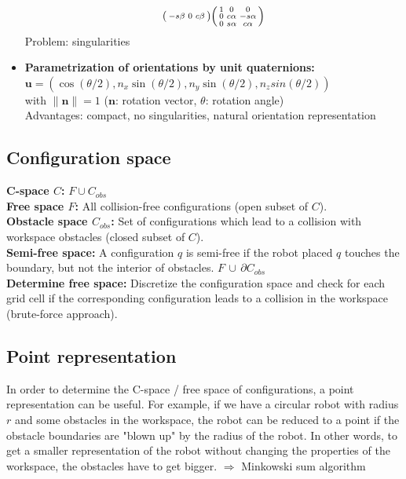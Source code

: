 \begin{multicols*}{2}
\begin{itemize}
\begin{align*}
\begin{psmallmatrix}
			-s\beta & 0 & c\beta
		\end{psmallmatrix}
		\begin{psmallmatrix}
			1 & 0 & 0\\
			0 & c\alpha & -s\alpha\\
			0 & s\alpha & c\alpha
		\end{psmallmatrix}
	\end{align*}
	Problem: singularities
	\item \textbf{Parametrization of orientations by unit quaternions:}\\
	$\mathbold{u} = (\cos(\theta/2), n_x \sin(\theta/2), n_y \sin(\theta/2), n_z sin(\theta/2))$\\
	with $\lVert \mathbold{n} \rVert = 1$ ($\mathbold{n}$: rotation vector, $\theta$: rotation angle)\\
	Advantages: compact, no singularities, natural orientation representation
\end{itemize}

\subsection{Configuration space}
\textbf{C-space $C$:} $F \cup C_{obs}$\\
\textbf{Free space $F$:} All collision-free configurations (open subset of $C$).\\
\textbf{Obstacle space $C_{obs}$:} Set of configurations which lead to a collision with workspace obstacles (closed subset of $C$).\\
\textbf{Semi-free space:} A configuration $q$ is semi-free if the robot placed $q$ touches the boundary, but not the interior of obstacles. $F \, \cup \, \partial C_{obs}$\\
\textbf{Determine free space:} Discretize the configuration space and check for each grid cell if the corresponding configuration leads to a collision in the workspace (brute-force approach).

\subsection{Point representation}
In order to determine the C-space / free space of configurations, a point representation can be useful. For example, if we have a circular robot with radius $r$ and some obstacles in the workspace, the robot can be reduced to a point if the obstacle boundaries are "blown up" by the radius of the robot. In other words, to get a smaller representation of the robot without changing the properties of the workspace, the obstacles have to get bigger. 
$\Rightarrow$ Minkowski sum algorithm


\end{multicols*}
